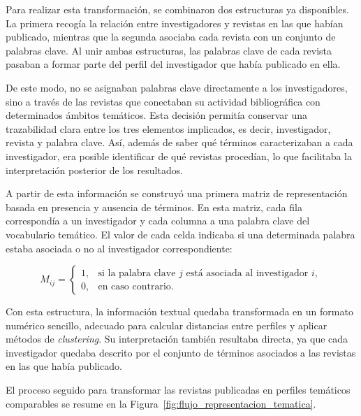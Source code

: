 \documentclass[11pt,spanish,listoffigures,listoftables]{tfgetsinf}
\begin{document}
Para realizar esta transformación, se combinaron dos estructuras ya disponibles. La primera recogía la relación entre investigadores y revistas en las que habían publicado, mientras que la segunda asociaba cada revista con un conjunto de palabras clave. Al unir ambas estructuras, las palabras clave de cada revista pasaban a formar parte del perfil del investigador que había publicado en ella.

De este modo, no se asignaban palabras clave directamente a los investigadores, sino a través de las revistas que conectaban su actividad bibliográfica con determinados ámbitos temáticos. Esta decisión permitía conservar una trazabilidad clara entre los tres elementos implicados, es decir, investigador, revista y palabra clave. Así, además de saber qué términos caracterizaban a cada investigador, era posible identificar de qué revistas procedían, lo que facilitaba la interpretación posterior de los resultados.

A partir de esta información se construyó una primera matriz de representación basada en presencia y ausencia de términos. En esta matriz, cada fila correspondía a un investigador y cada columna a una palabra clave del vocabulario temático. El valor de cada celda indicaba si una determinada palabra estaba asociada o no al investigador correspondiente:

\[
M_{ij} =
\begin{cases}
1, & \text{si la palabra clave } j \text{ está asociada al investigador } i,\\
0, & \text{en caso contrario.}
\end{cases}
\]

Con esta estructura, la información textual quedaba transformada en un formato numérico sencillo, adecuado para calcular distancias entre perfiles y aplicar métodos de \textit{clustering}. Su interpretación también resultaba directa, ya que cada investigador quedaba descrito por el conjunto de términos asociados a las revistas en las que había publicado.

El proceso seguido para transformar las revistas publicadas en perfiles temáticos comparables se resume en la Figura~\ref{fig:flujo_representacion_tematica}.
\end{document}
